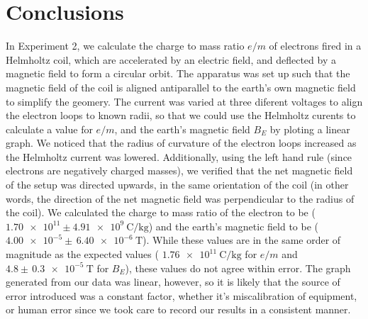 \documentclass[letterpaper]{article}
\begin{document}
\section{Conclusions}
In Experiment 2, we calculate the charge to mass ratio $e/m$ of electrons fired in a Helmholtz coil, which are accelerated by an electric field, and
deflected by a magnetic field to form a circular orbit. The apparatus
was set up such that the magnetic field of the coil is aligned antiparallel to the earth's own magnetic field
to simplify the geomery. The current was varied at three diferent voltages to align the electron loops to known radii, so that we could use the
Helmholtz curents to calculate a value for $e/m$, and the earth's magnetic field $B_E$ by ploting a linear graph. We noticed that the
radius of curvature of the electron loops increased as the Helmholtz current was lowered. Additionally, using the
left hand rule (since electrons are negatively charged masses), we verified that the net magnetic field of the
setup was directed upwards, in the same orientation of the coil (in other words, the direction of the net magnetic field
was perpendicular to the radius of the coil). We calculated the charge to mass ratio of the electron to be ($\num{1.70e11} \pm \SI{4.91e9}{\coulomb\per\kilogram}$)
and the earth's magnetic field to be
($\num{4.00e-5} \pm \,\SI{6.40e-6}{\tesla}$). While these values are in the same order of magnitude as the
expected values ( $\SI{1.76e11}{\coulomb\per\kilogram}$ for $e/m$
and $4.8 \pm \,\SI{0.3e-5}{\tesla}$ for $B_E$), these values do not agree within error. The
graph generated from our data was linear, however, so it is likely that the source of error introduced was a
constant factor, whether it's miscalibration of equipment, or human error since we took care to record our
results in a consistent manner.


\end{document}
